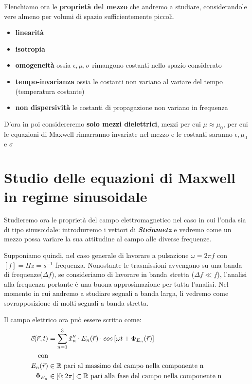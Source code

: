 Elenchiamo ora le \textbf{proprietà del mezzo} che andremo a studiare, considerandole vere almeno per volumi
di spazio sufficientemente piccoli.
\begin{itemize}
  \item \textbf{linearità}
  \item \textbf{isotropia}
  \item \textbf{omogeneità}  ossia $\epsilon, \mu, \sigma$ rimangono costanti nello spazio considerato
  \item \textbf{tempo-invarianza} ossia le costanti non variano al variare del tempo (temperatura costante)
  \item \textbf{non dispersività}  le costanti di propagazione non variano in frequenza
\end{itemize}

D'ora in poi considereremo \textbf{solo mezzi dielettrici}, mezzi per cui $\mu \approx \mu_0$, per cui
le equazioni di Maxwell rimarranno invariate nel mezzo e le costanti saranno $\epsilon, \mu_0$ e $\sigma$

\section{Studio delle equazioni di Maxwell in regime sinusoidale}
Studieremo ora le proprietà del campo elettromagnetico nel caso in cui l'onda sia di tipo sinusoidale:
introdurremo i vettori di \textbf{\textit{Steinmetz}} e vedremo come un mezzo possa variare la sua
attitudine al campo alle diverse frequenze.

Supponiamo quindi, nel caso generale di lavorare a pulsazione $\omega = 2\pi f$ con $[f] = Hz = s^{-1}$ frequenza.
Nonostante le trasmissioni avvengano su una banda di frequenze($\Delta f$), se consideriamo
di lavorare in banda stretta ($\Delta f \ll f$), l'analisi alla frequenza portante è una buona
approsimazione per tutta l'analisi. Nel momento in cui andremo a studiare segnali a
banda larga, li vedremo come sovrapposizione di molti segnali a banda stretta.

Il campo elettrico ora può essere scritto come:
\begin{equation}\begin{split}
  \vec{e}(\vec{r},t) &= \sum\limits_{n=1}^3 \hat{x}_n^{\prime\prime} \cdot E_n(\vec{r})\cdot cos\left[\omega t + \Phi_{E_n}(\vec{r})\right]\\
  \text{con}& \\
  E_n (\vec{r}) &\in \mathbb{R} \text{ pari al massimo del campo nella componente n} \\
  \Phi_{E_{n}} &\in [0;2\pi]\subset \mathbb{R} \text{ pari alla fase del campo nella componente n} \\
\end{split}\end{equation}

